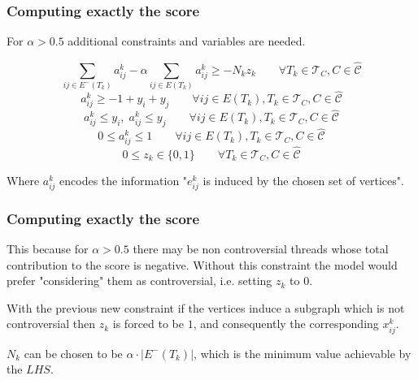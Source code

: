 \documentclass{beamer}
\begin{document}
\begin{frame}[c]
	\frametitle{Computing exactly the score}
	For $\alpha > 0.5$ additional constraints and variables are needed.

	\begin{equation}
		\sum^{}_{ij \in E^{-} (T_k)} a_{ij}^{k}  - \alpha \sum^{}_{ij \in E(T_k)}
		a_{ij} ^{k} \geq - N_{k} z_{k}  \quad\quad \forall T_{k} \in \mathcal{T} _{C}, C \in
		\hat{\mathcal{C}}
	\end{equation}
	\begin{equation}
		a_{ij}^{k} \geq -1 + y_i + y_j \quad\quad \forall ij \in E(T_{k}), T_{k} \in
		\mathcal{T}_{C}, C \in \mathcal{\hat{C}}
	\end{equation}
	\begin{equation}
		a_{ij}^{k} \leq y_i, \; a_{ij}^{k} \leq y_j \quad\quad \forall ij \in E(T_{k}), T_{k} \in
		\mathcal{T}_{C}, C \in \mathcal{\hat{C}}
	\end{equation}
	\begin{equation}
		0 \leq a_{ij}^{k} \leq 1 \quad\quad \forall ij \in E(T_{k}), T_{k} \in
		\mathcal{T}_{C}, C \in \mathcal{\hat{C}}
	\end{equation}
	\begin{equation}
		0 \leq z _{k} \in  \{0, 1\} \quad\quad \forall T_{k} \in \mathcal{T} _{C}, C \in
		\hat{\mathcal{C}}
	\end{equation}

	Where $a_{ij} ^{k}  $ encodes the information "$e_{ij}^{k}  $ is induced by the
	chosen set of vertices".

	\bigskip

\end{frame}
\begin{frame}[c]
	\frametitle{Computing exactly the score}
	This because for $\alpha > 0.5 $ there may be non controversial threads
	whose total contribution to the score is negative. Without this constraint
	the model would prefer "considering" them as controversial, i.e. setting
	$z_{k} $ to $0$.

	\bigskip

	With the previous new constraint if the vertices induce a subgraph which is
	not controversial then $z_{k} $ is forced to be $1$, and consequently the
	corresponding $x_{ij}^{k}  $.

	\bigskip

	$N_{k} $ can be chosen to be $\alpha \cdot |E^{-} (T_k)| $, which is the
	minimum value achievable by the $LHS$.

\end{frame}
\end{document}

